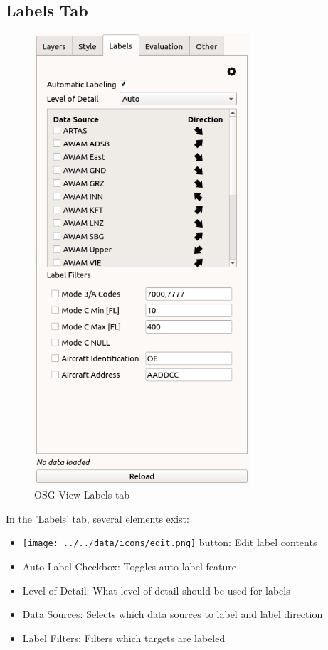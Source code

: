 \subsection{Labels Tab}
\label{sec:osgview_labels_tab} 
 
\begin{figure}[H]
   \center
    \includegraphics[width=8cm,frame]{figures/osgview_labels_tab.png}
  \caption{OSG View Labels tab}
\end{figure}

In the 'Labels' tab, several elements exist:

\begin{itemize}
 \item \texttt{[image: ../../data/icons/edit.png]} button: Edit label contents
 \item Auto Label Checkbox: Toggles auto-label feature
 \item Level of Detail: What level of detail should be used for labels
 \item Data Sources: Selects which data sources to label and label direction
 \item Label Filters: Filters which targets are labeled
\end{itemize} 
\ \\

